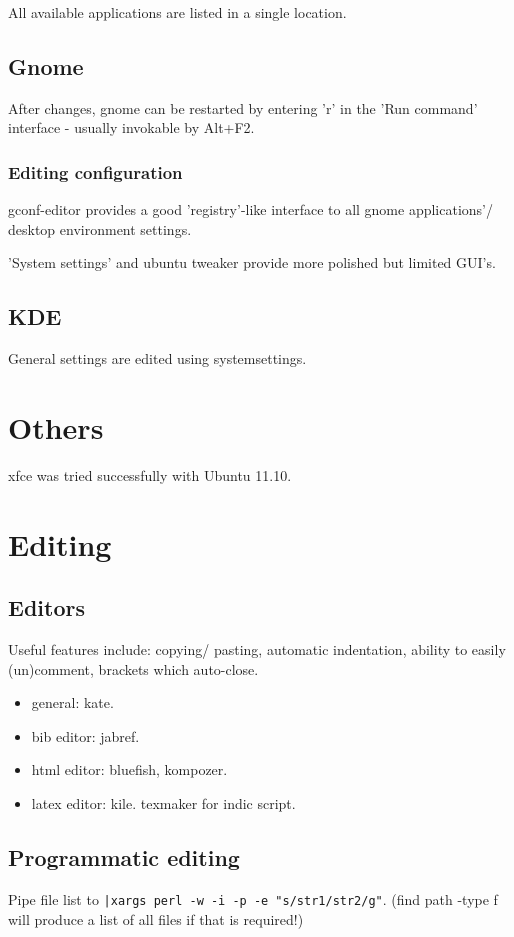 \documentclass[oneside, article]{memoir}
\begin{document}
All available applications are listed in a single location.

\subsection{Gnome}
After changes, gnome can be restarted by entering 'r' in the 'Run command' interface - usually invokable by Alt+F2.

\subsubsection{Editing configuration}
gconf-editor provides a good 'registry'-like interface to all gnome applications'/ desktop environment settings.

'System settings' and ubuntu tweaker provide more polished but limited GUI's.

\subsection{KDE}
General settings are edited using systemsettings.

\section{Others}
xfce was tried successfully with Ubuntu 11.10.

\section{Editing}
\subsection{Editors}
Useful features include: copying/ pasting, automatic indentation, ability to easily (un)comment, brackets which auto-close.


\begin{itemize}
\item general: kate.
\item bib editor: jabref.
\item html editor: bluefish, kompozer.
\item latex editor: kile. texmaker for indic script.
\end{itemize}

\subsection{Programmatic editing}
Pipe file list to \verb'|xargs perl -w -i -p -e "s/str1/str2/g"'. (find path -type f will produce a list of all files if that is required!)
\end{document}
